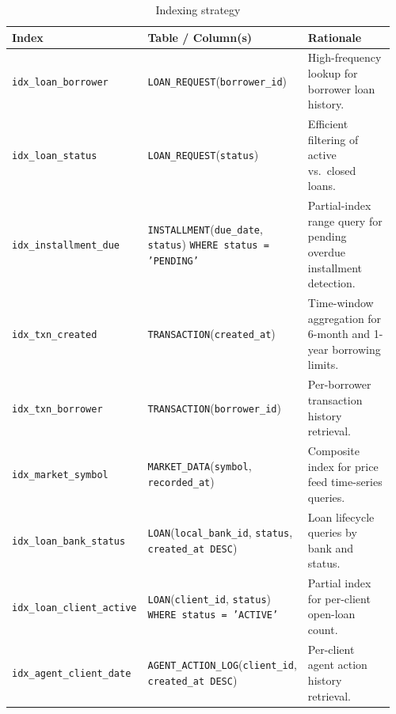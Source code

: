 \documentclass[12pt, a4paper]{report}
\newcommand{\tableheadcolor}{\rowcolor{TableHeadBg}}
\begin{document}
\begin{table}[H]
\centering
\caption[Indexing strategy]{Indexing strategy}
\label{tab:indexing-strategy}
\begingroup
\footnotesize
\setlength{\tabcolsep}{4pt}
\renewcommand{\arraystretch}{1.2}
\begin{tabular}{@{}%
  >{\raggedright\arraybackslash}p{0.19\linewidth}%
  >{\raggedright\arraybackslash}p{0.41\linewidth}%
  >{\raggedright\arraybackslash}p{0.36\linewidth}@{}}
\toprule
\tableheadcolor
\textbf{Index} & \textbf{Table / Column(s)} & \textbf{Rationale} \\
\midrule
\texttt{idx\_loan\_borrower} &
  \texttt{LOAN\_REQUEST}(\texttt{borrower\_id}) &
  High-frequency lookup for borrower loan history. \\
\texttt{idx\_loan\_status} &
  \texttt{LOAN\_REQUEST}(\texttt{status}) &
  Efficient filtering of active vs.\ closed loans. \\
\texttt{idx\_installment\_due} &
  \texttt{INSTALLMENT}(\texttt{due\_date}, \texttt{status})\newline
  \texttt{WHERE status = 'PENDING'} &
  Partial-index range query for pending overdue installment detection. \\
\texttt{idx\_txn\_created} &
  \texttt{TRANSACTION}(\texttt{created\_at}) &
  Time-window aggregation for 6-month and 1-year borrowing limits. \\
\texttt{idx\_txn\_borrower} &
  \texttt{TRANSACTION}(\texttt{borrower\_id}) &
  Per-borrower transaction history retrieval. \\
\texttt{idx\_market\_symbol} &
  \texttt{MARKET\_DATA}(\texttt{symbol},\newline
  \texttt{recorded\_at}) &
  Composite index for price feed time-series queries. \\
\texttt{idx\_loan\_bank\_status} &
  \texttt{LOAN}(\texttt{local\_bank\_id}, \texttt{status},\newline
  \texttt{created\_at DESC}) &
  Loan lifecycle queries by bank and status. \\
\texttt{idx\_loan\_client\_active} &
  \texttt{LOAN}(\texttt{client\_id}, \texttt{status})\newline
  \texttt{WHERE status = 'ACTIVE'} &
  Partial index for per-client open-loan count. \\
\texttt{idx\_agent\_client\_date} &
  \texttt{AGENT\_ACTION\_LOG}(\texttt{client\_id},\newline
  \texttt{created\_at DESC}) &
  Per-client agent action history retrieval. \\

\end{tabular}
\end{table}
\end{document}
